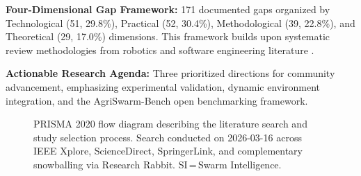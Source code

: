 \documentclass[review, 12pt, times]{elsarticle}
\begin{document}
\textbf{Four-Dimensional Gap Framework:} 171 documented
gaps organized by Technological (51, 29.8\%), Practical
(52, 30.4\%), Methodological (39, 22.8\%), and Theoretical
(29, 17.0\%) dimensions. This framework builds upon
systematic review methodologies from robotics and software
engineering literature \cite{brambilla2013,bayindir2016}.

\textbf{Actionable Research Agenda:} Three prioritized
directions for community advancement, emphasizing
experimental validation, dynamic environment integration,
and the AgriSwarm-Bench open benchmarking framework.

\begin{figure}[htbp]
\centering
{}
\caption{PRISMA 2020 flow diagram describing the literature
search and study selection process. Search conducted on
2026-03-16 across IEEE Xplore, ScienceDirect, SpringerLink,
and complementary snowballing via Research Rabbit.
SI\,=\,Swarm Intelligence.}
\label{fig:prisma}
\end{figure}
\end{document}
